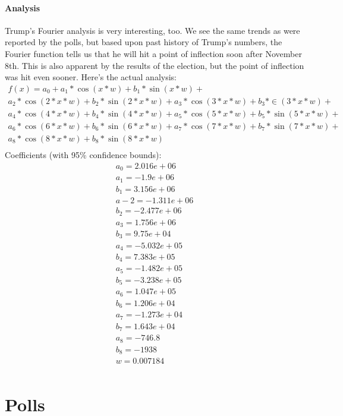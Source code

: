 \documentclass[twoside]{article}
\begin{document}
\paragraph{Analysis} Trump's Fourier analysis is very interesting, too. We see the same trends as were reported by the polls, but based upon past history of Trump's numbers,
the Fourier function tells us that he will hit a point of inflection soon after November 8th. This is also apparent by the results of the election, but the point of inflection
was hit even sooner. Here's the actual analysis:
\newpage
\begin{gather*}
f(x) =
          a_0 + a_1*\cos(x*w) + b_1*\sin(x*w) +\\
          a_2*\cos(2*x*w) + b_2*\sin(2*x*w) + a_3*\cos(3*x*w) + b_3*\in(3*x*w) +\\
          a_4*\cos(4*x*w) + b_4*\sin(4*x*w) + a_5*\cos(5*x*w) + b_5*\sin(5*x*w) +\\
          a_6*\cos(6*x*w) + b_6*\sin(6*x*w) + a_7*\cos(7*x*w) + b_7*\sin(7*x*w) +\\
          a_8*\cos(8*x*w) + b_8*\sin(8*x*w)\\
\end{gather*}
Coefficients (with 95\% confidence bounds):
\begin{gather*}
  a_0 =   2.016e+06\\
  a_1 =    -1.9e+06  \\
  b_1 =   3.156e+06  \\
  a-2 =  -1.311e+06  \\
  b_2 =  -2.477e+06  \\
  a_3 =   1.756e+06  \\
  b_3 =    9.75e+04  \\
  a_4 =  -5.032e+05  \\
  b_4 =   7.383e+05  \\
  a_5 =  -1.482e+05  \\
  b_5 =  -3.238e+05  \\
  a_6 =   1.047e+05  \\
  b_6 =   1.206e+04  \\
  a_7 =  -1.273e+04  \\
  b_7 =   1.643e+04  \\
  a_8 =      -746.8  \\
  b_8 =       -1938  \\
  w =    0.007184 \\
\end{gather*}
\newpage
\section{Polls}
\end{document}
